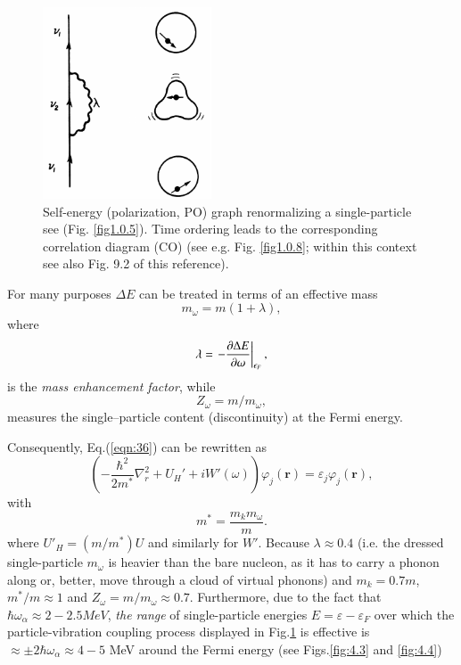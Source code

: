 \begin{figure}[h!]
\centerline {
\includegraphics*[width=5cm]{introduccion/figs/figintroD2}
}
\caption{Self-energy (polarization, PO) graph renormalizing  a single-particle see (Fig. \ref{fig1.0.5}). Time ordering leads to the corresponding correlation diagram (CO) (see e.g. Fig. \ref{fig1.0.8}; within this context see also \cite{Brink:05} Fig. 9.2 of this reference).}
\label{fig:4.2}
\end{figure}
For many purposes $\Delta E$ can be treated in terms of an effective mass 
\begin{equation}\label{eqn:38}
m_{\omega} = m(1+\lambda),
\end{equation}
where
\begin{equation}\label{eqn:39}
\lambda= \left.- \frac{\partial \Delta E}{\partial \omega}\right|_{\epsilon_F}, \idx{Mass enhancement factor}
\end{equation}
is the {\it mass enhancement factor}, while
\begin{equation}
\nonumber
Z_{\omega}=m/m_{\omega},
\end{equation}
measures the single--particle content (discontinuity) at the Fermi energy. 



Consequently, Eq.(\ref{eqn:36}) can be rewritten as
\begin{equation}
\left( - \frac{\hbar^2}{2m^*} \nabla_r^2 + U_H' + i W'(\omega) \right) \varphi_j(\mathbf r) = \varepsilon_j \varphi_j(\mathbf r),
\label{eqn:40a}
\end{equation}
with
\begin{equation}
m^* = \frac{m_k m_{\omega}}{m} .
\label{eqn:40b}
\end{equation}
 where $U'_H = (m/m^*) U$ and similarly for $W'$. Because $\lambda \approx 0.4$ (i.e. the dressed single-particle $m_{\omega}$ is heavier than the bare nucleon, as it has to carry a phonon along or, better, move through a cloud of virtual phonons) and $m_k=0.7m$, $m^*/m \approx 1$ and $Z_{\omega}=m/m_\omega\approx 0.7$. Furthermore, due to the fact that $\hbar \omega_{\alpha} \approx 2-2.5 MeV$, {\it the range} of single-particle energies $E=\varepsilon-\varepsilon_F$ over which the particle-vibration coupling process displayed in Fig.\ref{fig:4.2} is effective is $\approx \pm 2\hbar \omega_{\alpha} \approx 4-5$ MeV around the Fermi energy (see Figs.\ref{fig:4.3} and \ref{fig:4.4})

